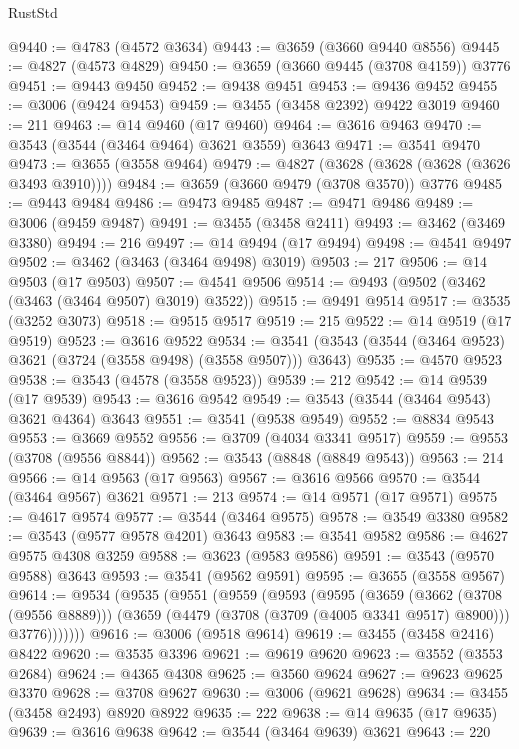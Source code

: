 \begin{lexlean}{RustStd}
\begin{coremodule}
@9440 := @4783 (@4572 @3634)
@9443 := @3659 (@3660 @9440 @8556)
@9445 := @4827 (@4573 @4829)
@9450 := @3659 (@3660 @9445 (@3708 @4159)) @3776
@9451 := @9443 @9450
@9452 := @9438 @9451
@9453 := @9436 @9452
@9455 := @3006 (@9424 @9453)
@9459 := @3455 (@3458 @2392) @9422 @3019
@9460 := 211
@9463 := @14 @9460 (@17 @9460)
@9464 := @3616 @9463
@9470 := @3543 (@3544 (@3464 @9464) @3621 @3559) @3643
@9471 := @3541 @9470
@9473 := @3655 (@3558 @9464)
@9479 := @4827 (@3628 (@3628 (@3628 (@3626 @3493 @3910))))
@9484 := @3659 (@3660 @9479 (@3708 @3570)) @3776
@9485 := @9443 @9484
@9486 := @9473 @9485
@9487 := @9471 @9486
@9489 := @3006 (@9459 @9487)
@9491 := @3455 (@3458 @2411)
@9493 := @3462 (@3469 @3380)
@9494 := 216
@9497 := @14 @9494 (@17 @9494)
@9498 := @4541 @9497
@9502 := @3462 (@3463 (@3464 @9498) @3019)
@9503 := 217
@9506 := @14 @9503 (@17 @9503)
@9507 := @4541 @9506
@9514 := @9493 (@9502 (@3462 (@3463 (@3464 @9507) @3019) @3522))
@9515 := @9491 @9514
@9517 := @3535 (@3252 @3073)
@9518 := @9515 @9517
@9519 := 215
@9522 := @14 @9519 (@17 @9519)
@9523 := @3616 @9522
@9534 := @3541 (@3543 (@3544 (@3464 @9523) @3621 (@3724 (@3558 @9498) (@3558 @9507))) @3643)
@9535 := @4570 @9523
@9538 := @3543 (@4578 (@3558 @9523))
@9539 := 212
@9542 := @14 @9539 (@17 @9539)
@9543 := @3616 @9542
@9549 := @3543 (@3544 (@3464 @9543) @3621 @4364) @3643
@9551 := @3541 (@9538 @9549)
@9552 := @8834 @9543
@9553 := @3669 @9552
@9556 := @3709 (@4034 @3341 @9517)
@9559 := @9553 (@3708 (@9556 @8844))
@9562 := @3543 (@8848 (@8849 @9543))
@9563 := 214
@9566 := @14 @9563 (@17 @9563)
@9567 := @3616 @9566
@9570 := @3544 (@3464 @9567) @3621
@9571 := 213
@9574 := @14 @9571 (@17 @9571)
@9575 := @4617 @9574
@9577 := @3544 (@3464 @9575)
@9578 := @3549 @3380
@9582 := @3543 (@9577 @9578 @4201) @3643
@9583 := @3541 @9582
@9586 := @4627 @9575 @4308 @3259
@9588 := @3623 (@9583 @9586)
@9591 := @3543 (@9570 @9588) @3643
@9593 := @3541 (@9562 @9591)
@9595 := @3655 (@3558 @9567)
@9614 := @9534
    (@9535
      (@9551
        (@9559
          (@9593
            (@9595
              (@3659
                (@3662 (@3708 (@9556 @8889)))
                (@3659 (@4479 (@3708 (@3709 (@4005 @3341 @9517) @8900))) @3776)))))))
@9616 := @3006 (@9518 @9614)
@9619 := @3455 (@3458 @2416) @8422
@9620 := @3535 @3396
@9621 := @9619 @9620
@9623 := @3552 (@3553 @2684)
@9624 := @4365 @4308
@9625 := @3560 @9624
@9627 := @9623 @9625 @3370
@9628 := @3708 @9627
@9630 := @3006 (@9621 @9628)
@9634 := @3455 (@3458 @2493) @8920 @8922
@9635 := 222
@9638 := @14 @9635 (@17 @9635)
@9639 := @3616 @9638
@9642 := @3544 (@3464 @9639) @3621
@9643 := 220

\end{coremodule}
\end{lexlean}

